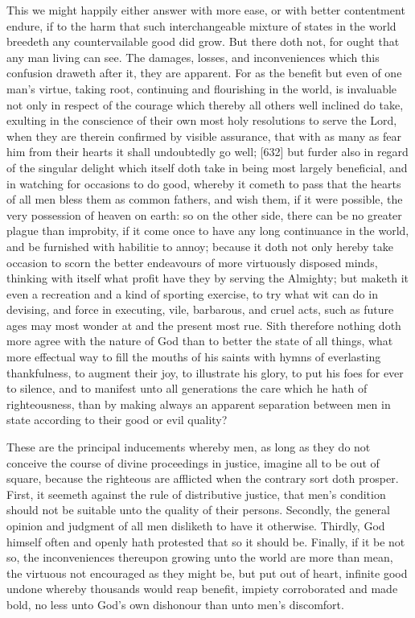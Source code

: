 This we might happily either answer with more ease, or with better contentment endure, if to the harm that such interchangeable mixture of states in the world breedeth any countervailable good did grow. But there doth not, for ought that any man living can see. The damages, losses, and inconveniences which this confusion draweth after it, they are apparent. For as the benefit but even of one man’s virtue, taking root, continuing and flourishing in the world, is invaluable not only in respect of the courage which thereby all others well inclined do take, exulting in the conscience of their own most holy resolutions to serve the Lord, when they are therein confirmed by visible assurance, that with as many as fear him from their hearts it shall undoubtedly go well; [632] but furder also in regard of the singular delight which itself doth take in being most largely beneficial, and in watching for occasions to do good, whereby it cometh to pass that the hearts of all men bless them as common fathers, and wish them, if it were possible, the very possession of heaven on earth: so on the other side, there can be no greater plague than improbity, if it come once to have any long continuance in the world, and be furnished with habilitie to annoy; because it doth not only hereby take occasion to scorn the better endeavours of more virtuously disposed minds, thinking with itself what profit have they by serving the Almighty; but maketh it even a recreation and a kind of sporting exercise, to try what wit can do in devising, and force in executing, vile, barbarous, and cruel acts, such as future ages may most wonder at and the present most rue. Sith therefore nothing doth more agree with the nature of God than to better the state of all things, what more effectual way to fill the mouths of his saints with hymns of everlasting thankfulness, to augment their joy, to illustrate his glory, to put his foes for ever to silence, and to manifest unto all generations the care which he hath of righteousness, than by making always an apparent separation between men in state according to their good or evil quality?

These are the principal inducements whereby men, as long as they do not conceive the course of divine proceedings in justice, imagine all to be out of square, because the righteous are afflicted when the contrary sort doth prosper. First, it seemeth against the rule of distributive justice, that men’s condition should not be suitable unto the quality of their persons. Secondly, the general opinion and judgment of all men disliketh to have it otherwise. Thirdly, God himself often and openly hath protested that so it should be. Finally, if it be not so, the inconveniences thereupon growing unto the world are more than mean, the virtuous not encouraged as they might be, but put out of heart, infinite good undone whereby thousands would reap benefit, impiety corroborated and made bold, no less unto God’s own dishonour than unto men’s discomfort.

